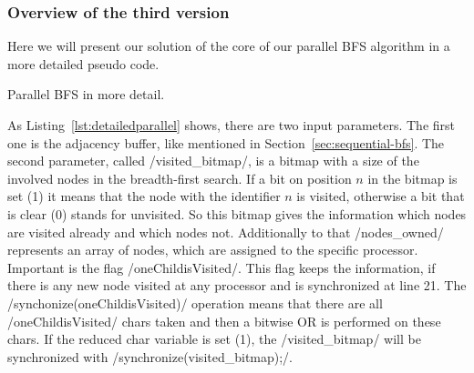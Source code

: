 \documentclass[12pt,a4paper]{article}
\begin{document}
\subsubsection{Overview of the third version}
\label{sec:core}
Here we will present our solution of the core of our parallel BFS algorithm in a more detailed pseudo code.\\
\begin{listing}[h]
\begin{ccode}
/*
input: every proc has adjacency buffer of owned nodes, visited_bitmap where root is set to one
output: parent array
*/
void* BFS(adj_buffer, visited_bitmap){
	char oneChildisVisited = 1;
	while (oneChildisVisited){
	oneChildisVisited = 0;
	for (i = 0; i < size(nodes_owned); i++){
		if (nodes_owned[i] is visited for the first time) {
			neighbours = get_neighbours(adj_buffer, nodes_owned[i]);
			for (j = 0; j < size(neighbours); j++){
				if (neighbours[j] is not visited) {
					oneChildisVisited = 1;
					set_visited_bitmap(visited_bitmap, neighbours[j]); // sets the visited bitmap on position of neighbour[j] to 1
					save_parent(parent_array, nodes_owned[i]+1,neighbours[j]); // saves that nodes_owned[i]+1 is parent of neighbours[j] in parent array
				}
			}
		}	
	}
	synchronize(oneChildisVisited);
	if (oneChildisVisited){
		sychronize(visited_bitmap);
	}
	return parent_array;
}
\end{ccode}
\caption{Parallel BFS in more detail.}
\label{lst:detailedparallel}
\end{listing}
As Listing~\ref{lst:detailedparallel} shows, there are two input parameters. The first one is the adjacency buffer, like mentioned in Section~\ref{sec:sequential-bfs}. The second parameter, called \cinline/visited_bitmap/, is a bitmap with a size of the involved nodes in the breadth-first search. If a bit on position \(n\) in the bitmap is set (1) it means that the node with the identifier \(n\) is visited, otherwise a bit that is clear (0) stands for unvisited. So this bitmap gives the information which nodes are visited already and which nodes not. Additionally to that \cinline/nodes_owned/ represents an array of nodes, which are assigned to the specific processor.\\
Important is the flag \cinline/oneChildisVisited/. This flag keeps the information, if there is any new node visited at any processor and is synchronized at line 21. The \cinline/synchonize(oneChildisVisited)/ operation means that there are all \cinline/oneChildisVisited/ chars taken and then a bitwise OR is performed on these chars. If the reduced char variable is set (1), the \cinline/visited_bitmap/ will be synchronized with \cinline/synchronize(visited_bitmap);/.\\
\end{document}
